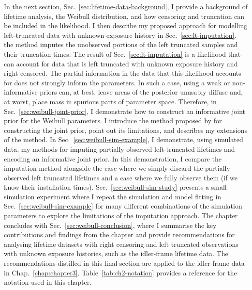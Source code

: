 In the next section, Sec.~\ref{sec:lifetime-data-background}, I provide a background of lifetime analysis, the Weibull distribution, and how censoring and truncation can be included in the likelihood. I then describe my proposed approach for modelling left-truncated data with unknown exposure history in Sec.~\ref{sec:lt-imputation}. the method imputes the unobserved portions of the left truncated samples and their truncation times. The result of Sec.~\ref{sec:lt-imputation} is a likelihood that can account for data that is left truncated with unknown exposure history and right censored. The partial information in the data that this likelihood accounts for does not strongly inform the parameters. In such a case, using a weak or non-informative priors can, at best, leave areas of the posterior unusably diffuse and, at worst, place mass in spurious parts of parameter space. Therefore, in Sec.~\ref{sec:weibull-joint-prior}, I demonstrate how to construct an informative joint prior for the Weibull parameters. I introduce the method proposed by \citet{kaminskiy2005} for constructing the joint prior, point out its limitations, and describes my extensions of the method. In Sec.~\ref{sec:weibull-sim-example}, I demonstrate, using simulated data, my methods for imputing partially observed left-truncated lifetimes and encoding an informative joint prior. In this demonstration, I compare the imputation method alongside the case where we simply discard the partially observed left truncated lifetimes and a case where we fully observe them (if we know their installation times). Sec.~\ref{sec:weibull-sim-study} presents a small simulation experiment where I repeat the simulation and model fitting in Sec.~\ref{sec:weibull-sim-example} for many different combinations of the simulation parameters to explore the limitations of the imputation approach. The chapter concludes with Sec.~\ref{sec:weibull-conclusion}, where I summarise the key contributions and findings from the chapter and provide recommendations for analysing lifetime datasets with right censoring and left truncated observations with unknown exposure histories, such as the idler-frame lifetime data. The recommendations distilled in this final section are applied to the idler-frame data in Chap.~\ref{chap:chapter3}. Table~\ref{tab:ch2-notation} provides a reference for the notation used in this chapter.

